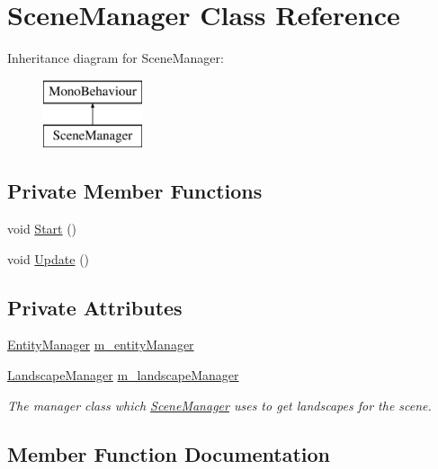 \hypertarget{class_scene_manager}{}\section{Scene\+Manager Class Reference}
\label{class_scene_manager}
Inheritance diagram for Scene\+Manager\+:\begin{figure}[H]
\begin{center}
\leavevmode
\includegraphics[height=2.000000cm]{class_scene_manager}
\end{center}
\end{figure}
\subsection*{Private Member Functions}
\begin{DoxyCompactItemize}
\item 
void \hyperlink{class_scene_manager_a86cc86842e457ed6c9d3268df97e1f9e}{Start} ()
\item 
void \hyperlink{class_scene_manager_a1700705e183249b1b8c6d95b8d044f69}{Update} ()
\end{DoxyCompactItemize}
\subsection*{Private Attributes}
\begin{DoxyCompactItemize}
\item 
\hyperlink{class_entity_manager}{Entity\+Manager} \hyperlink{class_scene_manager_abf81d312ff06974f7d47b03870e1578a}{m\+\_\+entity\+Manager}
\item 
\hyperlink{class_landscape_manager}{Landscape\+Manager} \hyperlink{class_scene_manager_a801b5db7fc9747ed992992b20d523e8a}{m\+\_\+landscape\+Manager}
\begin{DoxyCompactList}\small\item\em The manager class which \hyperlink{class_scene_manager}{Scene\+Manager} uses to get landscapes for the scene. \end{DoxyCompactList}\end{DoxyCompactItemize}


\subsection{Member Function Documentation}
\mbox{\label{class_scene_manager_a86cc86842e457ed6c9d3268df97e1f9e}} 
